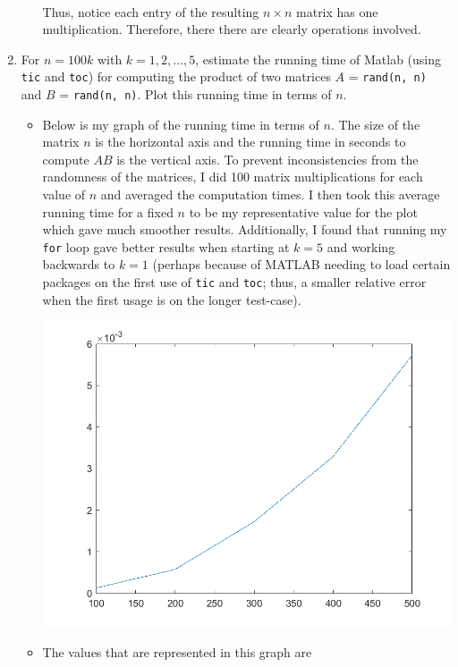 \documentclass[10pt,a4paper]{article}
\theoremstyle{definition}
\theoremstyle{definition}
\numberwithin{equation}{section}
\begin{document}
\begin{enumerate}[label = (\alph*)]
\begin{itemize}
\begin{align*}
	\end{align*}
	Thus, notice each entry of the resulting $n \times n$ matrix has one multiplication. Therefore, there there are clearly  operations involved. 
	\end{itemize}
\item For $n = 100k$ with $k =1, 2, \ldots, 5$, estimate the running time of Matlab (using \verb!tic! and \verb!toc!) for computing the product of two matrices $A$ = \verb!rand(n, n)! and $B$ = \verb!rand(n, n)!. Plot this running time in terms of $n$. 
	\begin{itemize}
	\item Below is my graph of the running time in terms of $n$. The size of the matrix $n$ is the horizontal axis and the running time in seconds to compute $AB$ is the vertical axis. To prevent inconsistencies from the randomness of the matrices, I did 100 matrix multiplications for each value of $n$ and averaged the computation times. I then took this average running time for a fixed $n$ to be my representative value for the plot which gave much smoother results. Additionally, I found that running my \verb!for! loop gave better results when starting at $k = 5$ and working backwards to $k = 1$ (perhaps because of MATLAB needing to load certain packages on the first use of \verb!tic! and \verb!toc!; thus, a smaller relative error when the first usage is on the longer test-case). 
	\begin{center}
	\includegraphics[scale=.8]{Time Plot}
	\end{center}
	\item The values that are represented in this graph are

\end{itemize}
\end{enumerate}
\end{document}
